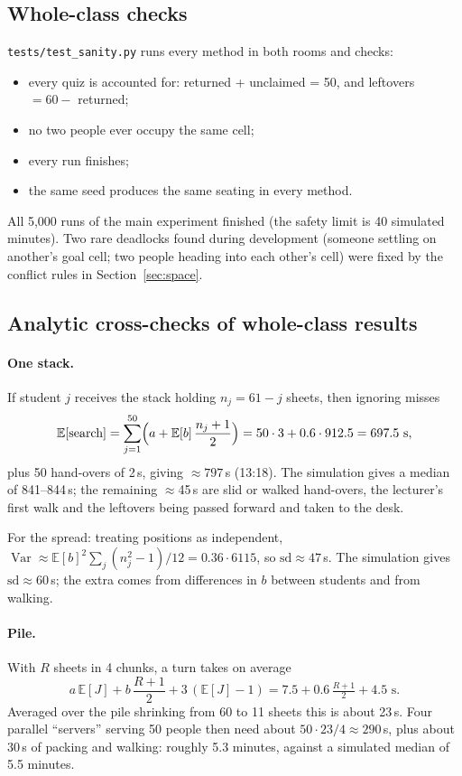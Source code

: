 \documentclass[11pt,a4paper]{article}
\newcommand{\E}{\mathbb{E}}
\newcommand{\Var}{\operatorname{Var}}
\begin{document}
\subsection{Whole-class checks}
\texttt{tests/test\_sanity.py} runs every method in both rooms and checks:
\begin{itemize}
  \item every quiz is accounted for: returned + unclaimed = 50, and leftovers $= 60 -$ returned;
  \item no two people ever occupy the same cell;
  \item every run finishes;
  \item the same seed produces the same seating in every method.
\end{itemize}
All 5{,}000 runs of the main experiment finished (the safety limit is 40 simulated minutes).
Two rare deadlocks found during development (someone settling on another's goal cell; two people heading into each other's cell) were fixed by the conflict rules in Section~\ref{sec:space}.

\subsection{Analytic cross-checks of whole-class results}
\paragraph{One stack.} If student $j$ receives the stack holding $n_j = 61-j$ sheets, then ignoring misses
\[
\E[\text{search}] = \sum_{j=1}^{50}\Bigl(a + \E[b]\,\frac{n_j+1}{2}\Bigr) = 50\cdot3 + 0.6\cdot 912.5 = 697.5\text{ s},
\]
plus 50 hand-overs of 2\,s, giving $\approx 797$\,s (13:18).
The simulation gives a median of 841--844\,s; the remaining $\approx$45\,s are slid or walked hand-overs, the lecturer's first walk and the leftovers being passed forward and taken to the desk.

For the spread: treating positions as independent, $\Var \approx \E[b]^2\sum_j (n_j^2-1)/12 = 0.36\cdot 6115$, so $\text{sd}\approx 47$\,s. The simulation gives $\text{sd}\approx 60$\,s; the extra comes from differences in $b$ between students and from walking.

\paragraph{Pile.} With $R$ sheets in 4 chunks, a turn takes on average
\[
a\,\E[J] + b\,\frac{R+1}{2} + 3\,(\E[J]-1) = 7.5 + 0.6\,\tfrac{R+1}{2} + 4.5 \text{ s}.
\]
Averaged over the pile shrinking from 60 to 11 sheets this is about 23\,s. Four parallel ``servers'' \cite{kleinrock1975} serving 50 people then need about $50\cdot23/4 \approx 290$\,s, plus about 30\,s of packing and walking: roughly 5.3 minutes, against a simulated median of 5.5 minutes.
\end{document}
